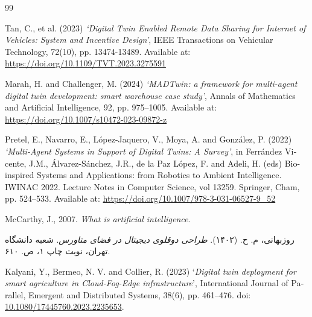 \begin{thebibliography}{99}
\begin{latin}
Tan, C., et al. (2023) \textit{‘Digital Twin Enabled Remote Data Sharing for Internet of Vehicles: System and Incentive Design’}, IEEE Transactions on Vehicular Technology, 72(10), pp. 13474-13489. Available at: \url{https://doi.org/10.1109/TVT.2023.3275591}

Marah, H. and Challenger, M. (2024) \textit{‘MADTwin: a framework for multi-agent digital twin development: smart warehouse case study’}, Annals of Mathematics and Artificial Intelligence, 92, pp. 975–1005. Available at: \url{https://doi.org/10.1007/s10472-023-09872-z}

Pretel, E., Navarro, E., López-Jaquero, V., Moya, A. and González, P. (2022) \textit{‘Multi-Agent Systems in Support of Digital Twins: A Survey’}, in Ferrández Vicente, J.M., Álvarez-Sánchez, J.R., de la Paz López, F. and Adeli, H. (eds) Bio-inspired Systems and Applications: from Robotics to Ambient Intelligence. IWINAC 2022. Lecture Notes in Computer Science, vol 13259. Springer, Cham, pp.  524–533. Available at: \url{https://doi.org/10.1007/978-3-031-06527-9_52}

McCarthy, J., 2007. \textit{What is artificial intelligence}.

\end{latin}

روزبهانی، م. ح. (۱۴۰۲).
\textit{طراحی دوقلوی دیجیتال در فضای متاورس}. شعبه دانشگاه تهران، نوبت چاپ ۱، ص. ۶۱۰.

\begin{latin}

Kalyani, Y., Bermeo, N. V. and Collier, R. (2023) ‘\textit{Digital twin deployment for smart agriculture in Cloud-Fog-Edge infrastructure}’, International Journal of Parallel, Emergent and Distributed Systems, 38(6), pp. 461–476. doi: \url{10.1080/17445760.2023.2235653}.
%
%
%
%
%
%

\end{latin}



\end{thebibliography}